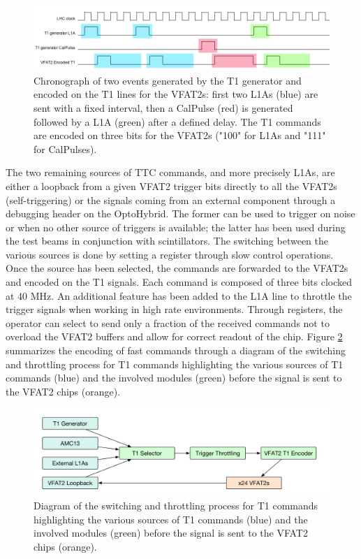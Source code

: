       \begin{figure}[h!]
        \centering
        \includegraphics[width=\textwidth]{img/II-3-test-beam/t1-chrono.png}
        \caption{Chronograph of two events generated by the T1 generator and encoded on the T1 lines for the VFAT2s: first two L1As (blue) are sent with a fixed interval, then a CalPulse (red) is generated followed by a L1A (green) after a defined delay. The T1 commands are encoded on three bits for the VFAT2s ("100" for L1As and "111" for CalPulses).}
        \label{fig:II-3-t1-chrono}
      \end{figure}

      The two remaining sources of TTC commands, and more precisely L1As, are either a loopback from a given VFAT2 trigger bits directly to all the VFAT2s (self-triggering) or the signals coming from an external component through a debugging header on the OptoHybrid. The former can be used to trigger on noise or when no other source of triggers is available; the latter has been used during the test beams in conjunction with scintillators. The switching between the various sources is done by setting a register through slow control operations. Once the source has been selected, the commands are forwarded to the VFAT2s and encoded on the T1 signals. Each command is composed of three bits clocked at 40 MHz. An additional feature has been added to the L1A line to throttle the trigger signals when working in high rate environments. Through registers, the operator can select to send only a fraction of the received commands not to overload the VFAT2 buffers and allow for correct readout of the chip. Figure \ref{fig:II-3-t1-switch} summarizes the encoding of fast commands through a diagram of the switching and throttling process for T1 commands highlighting the various sources of T1 commands (blue) and the involved modules (green) before the signal is sent to the VFAT2 chips (orange).

      \begin{figure}[h!]
        \centering
        \includegraphics[width=\textwidth]{img/II-3-test-beam/t1-switch}
        \caption{Diagram of the switching and throttling process for T1 commands highlighting the various sources of T1 commands (blue) and the involved modules (green) before the signal is sent to the VFAT2 chips (orange).}
        \label{fig:II-3-t1-switch}
      \end{figure}


